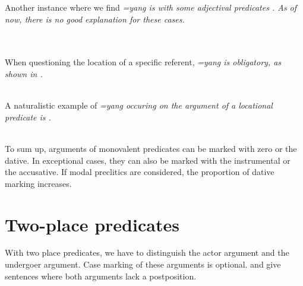 Another instance where we find \em =yang \em is with some adjectival predicates . As of now, there is no good explanation for these cases.


 \\

 \\

When questioning the location of a specific referent, \em =yang \em is obligatory, as shown in .

 \\
A naturalistic example of \em =yang \em occuring on the argument of a locational predicate is .


 \\
To sum up, arguments of monovalent predicates can be marked with zero or the dative. In exceptional cases, they can also be marked with the instrumental or the accusative. If modal preclitics are considered, the proportion of dative marking increases.




\section{Two-place predicates}\label{sec:argstr:Two-placepredicates}
With two place predicates, we have to distinguish the actor argument and the undergoer argument. Case marking of these arguments is optional.
 and  give sentences where both   arguments lack a postposition.

